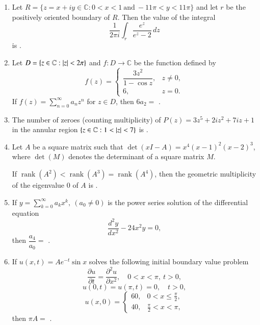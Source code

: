 \documentclass[journal,12pt,onecolumn]{IEEEtran}
\theoremstyle{remark}
\begin{document}
\begin{enumerate}[start=1, label=Q.\arabic*]
\hfill{}


\item Let $R=\{z=x+iy \in \mathbb{C} : 0<x<1 \ \text{and}\ -11\pi<y<11\pi\}$ and let $r$ be the positively oriented boundary of $R$.  
Then the value of the integral
\[
\frac{1}{2\pi i}\int_{r}\frac{e^{z}}{e^{z}-2}\,dz
\]
is \underline{\hspace{2cm}}.  

\hfill{}


\item Let $D=\{z \in \mathbb{C} : \left\vert z\right\vert<2\pi\}$ and $f : D\to \mathbb{C}$ be the function defined by
\[
f(z)=
\begin{cases}
\dfrac{3z^{2}}{1-\cos z}, & z \neq 0,\\[6pt]
6, & z=0.
\end{cases}
\]
If $f(z)=\sum_{n=0}^{\infty} a_{n} z^{n}$ for $z \in D$, then $6a_{2}=$ \underline{\hspace{2cm}}.  

\hfill{}


\item The number of zeroes (counting multiplicity) of $P(z)=3z^{5}+2iz^{2}+7iz+1$ in the annular region $\{z \in \mathbb{C} : 1<\left\vert z\right\vert<7\}$ is \underline{\hspace{2cm}}.  

\hfill{}


\item Let $A$ be a square matrix such that $\det(xI-A)=x^{4}(x-1)^{2}(x-2)^{3}$, where $\det(M)$ denotes the determinant of a square matrix $M$.  

If $\operatorname{rank}(A^{2})<\operatorname{rank}(A^{3})=\operatorname{rank}(A^{4})$, then the geometric multiplicity of the eigenvalue $0$ of $A$ is \underline{\hspace{2cm}}.  

\hfill{}
\item If $y=\sum_{k=0}^{\infty} a_{k} x^{k}, \ (a_{0}\neq 0)$ is the power series solution of the differential equation
\[
\dfrac{d^{2}y}{dx^{2}}-24x^{2}y=0,
\]
then $\dfrac{a_{4}}{a_{0}}=$ \underline{\hspace{2cm}}.  

\hfill{}


\item If $u(x,t)=Ae^{-t}\sin x$ solves the following initial boundary value problem
\[
\dfrac{\partial u}{\partial t}=\dfrac{\partial^{2}u}{\partial x^{2}}, \quad 0<x<\pi, \ t>0,
\]
\[
u(0,t)=u(\pi,t)=0, \quad t>0,
\]
\[
u(x,0)=
\begin{cases}
60, & 0<x\leq \tfrac{\pi}{2},\\
40, & \tfrac{\pi}{2}<x<\pi,
\end{cases}
\]
then $\pi A=$ \underline{\hspace{2cm}}.  


\end{enumerate}
\end{document}
